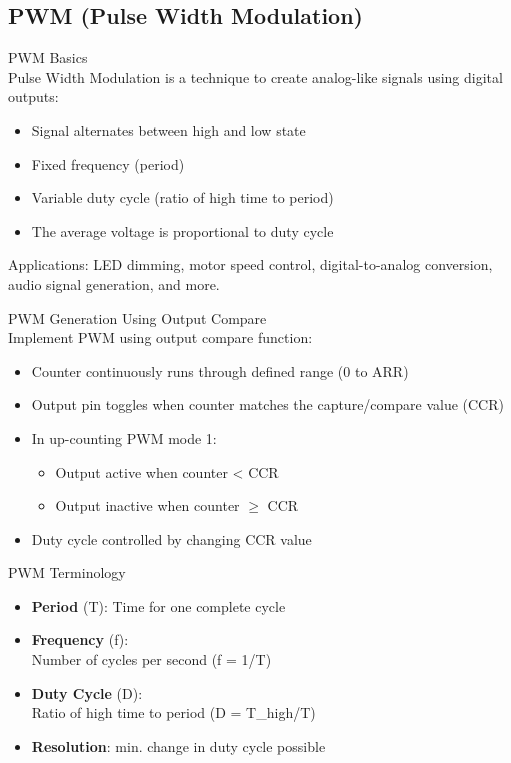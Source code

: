 \raggedcolumns
\columnbreak

\subsection{PWM (Pulse Width Modulation)}


\begin{definition}{PWM Basics}\\
Pulse Width Modulation is a technique to create analog-like signals using digital outputs:
\begin{itemize}
    \item Signal alternates between high and low state
    \item Fixed frequency (period)
    \item Variable duty cycle (ratio of high time to period)
    \item The average voltage is proportional to duty cycle
\end{itemize}
Applications: LED dimming, motor speed control, digital-to-analog conversion, audio signal generation, and more.
\end{definition}


\begin{concept}{PWM Generation Using Output Compare}\\
Implement PWM using output compare function:
\begin{itemize}
    \item Counter continuously runs through defined range (0 to ARR)
    \item Output pin toggles when counter matches the capture/compare value (CCR)
    \item In up-counting PWM mode 1:
    \begin{itemize}
        \item Output active when counter < CCR
        \item Output inactive when counter $\geq$ CCR
    \end{itemize}
    \item Duty cycle controlled by changing CCR value
\end{itemize}
\end{concept}

\multend


\begin{theorem}{PWM Terminology}
\begin{itemize}
    \item \textbf{Period} (T): Time for one complete cycle
    \item \textbf{Frequency} (f): \\ Number of cycles per second (f = 1/T)
    \item \textbf{Duty Cycle} (D): \\ Ratio of high time to period (D = T\_{high}/T)
    \item \textbf{Resolution}: min. change in duty cycle possible
\end{itemize}
\end{theorem}


